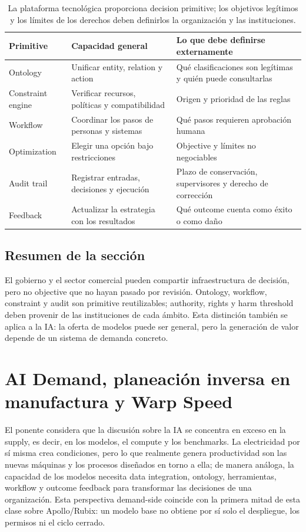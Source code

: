 \documentclass[a4paper]{article}
\begin{document}
\begin{table}[H]
\centering
\begin{tabular}{L{0.18\textwidth}L{0.34\textwidth}L{0.38\textwidth}}
\toprule
Primitive & Capacidad general & Lo que debe definirse externamente \\
\midrule
Ontology & Unificar entity, relation y action & Qué clasificaciones son legítimas y quién puede consultarlas \\
Constraint engine & Verificar recursos, políticas y compatibilidad & Origen y prioridad de las reglas \\
Workflow & Coordinar los pasos de personas y sistemas & Qué pasos requieren aprobación humana \\
Optimization & Elegir una opción bajo restricciones & Objective y límites no negociables \\
Audit trail & Registrar entradas, decisiones y ejecución & Plazo de conservación, supervisores y derecho de corrección \\
Feedback & Actualizar la estrategia con los resultados & Qué outcome cuenta como éxito o como daño \\
\bottomrule
\end{tabular}
\caption{La plataforma tecnológica proporciona decision primitive; los objetivos legítimos y los límites de los derechos deben definirlos la organización y las instituciones.}
\end{table}

\subsection{Resumen de la sección}

El gobierno y el sector comercial pueden compartir infraestructura de decisión, pero no objective que no hayan pasado por revisión. Ontology, workflow, constraint y audit son primitive reutilizables; authority, rights y harm threshold deben provenir de las instituciones de cada ámbito. Esta distinción también se aplica a la IA: la oferta de modelos puede ser general, pero la generación de valor depende de un sistema de demanda concreto.
\section{AI Demand, planeación inversa en manufactura y Warp Speed}

El ponente considera que la discusión sobre la IA se concentra en exceso en la supply, es decir, en los modelos, el compute y los benchmarks. La electricidad por sí misma crea condiciones, pero lo que realmente genera productividad son las nuevas máquinas y los procesos diseñados en torno a ella; de manera análoga, la capacidad de los modelos necesita data integration, ontology, herramientas, workflow y outcome feedback para transformar las decisiones de una organización. Esta perspectiva demand-side coincide con la primera mitad de esta clase sobre Apollo/Rubix: un modelo base no obtiene por sí solo el despliegue, los permisos ni el ciclo cerrado.
\end{document}
